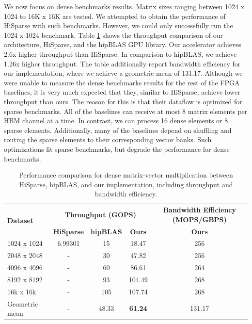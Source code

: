 \documentclass[manuscript,screen,review]{acmart}
\begin{document}
We now focus on dense benchmarks results. Matrix sizes ranging between 1024 x 1024 to 16K x 16K are tested. We attempted to obtain the performance of HiSparse with such benchmarks. However, we could only successfully run the 1024 x 1024 benchmark. Table \ref{dense} shows the throughput comparison of our architecture, HiSparse, and the hipBLAS GPU library. Our accelerator achieves 2.6x higher throughput than HiSparse. In comparison to hipBLAS, we achieve 1.26x higher throughput. The table additionally report bandwidth efficiency for our implementation, where we achieve a geometric mean of 131.17. Although we were unable to measure the dense benchmarks results for the rest of the FPGA baselines, it is very much expected that they, similar to HiSparse, achieve lower throughput than ours. The reason for this is that their dataflow is optimized for sparse benchmarks. All of the baselines can receive at most 8 matrix elements per HBM channel at a time. In contrast, we can process 16 dense elements or 8 sparse elements. Additionally, many of the baselines depend on shuffling and routing the sparse elements to their corresponding vector banks. Such optimizations fit sparse benchmarks, but degrade the performance for dense benchmarks.



\begin{table}[h!]
	\centering
	\begin{tabular}{|l|c|c|c|c|}
		\hline
		\multirow{2}{*}{\textbf{Dataset}} & \multicolumn{3}{c|}{\textbf{Throughput (GOPS)}} & \textbf{Bandwidth Efficiency (MOPS/GBPS)} \\
		\cline{2-5}
		& \textbf{HiSparse} & \textbf{hipBLAS} & \textbf{Ours} & \textbf{Ours} \\
		\hline
		1024 x 1024 & 6.99301 & 15 & 18.47 & 256 \\
		2048 x 2048 & - & 30 & 47.82 & 256 \\
		4096 x 4096 & - & 60 & 86.61 & 264 \\
		8192 x 8192 & - & 93 & 104.49 & 268 \\
		16k x 16k & - & 105 & 107.74 & 268 \\
		\hline
		Geometric mean & - & 48.33 & \textbf{61.24} & 131.17 \\
		\hline
	\end{tabular}
	\caption{Performance comparison for dense matrix-vector multiplication between HiSparse, hipBLAS, and our implementation, including throughput and bandwidth efficiency.}
	\label{dense}
\end{table}
\end{document}
